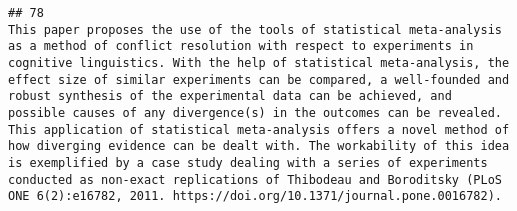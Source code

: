 \documentclass[
  english,
  man]{apa6}
\begin{document}
\begin{verbatim}
## 78                                                                                                                                                                                                                                                                                                                                                                                                                                                                                                                                                                                                                                                                                                                                                                                                                                                                                                                                                                                                                                                                                                                                                                                                                                                                                                                                                                                                                                                                                                                                                                                                                                                                                                                                                                                                                                                                                  This paper proposes the use of the tools of statistical meta-analysis as a method of conflict resolution with respect to experiments in cognitive linguistics. With the help of statistical meta-analysis, the effect size of similar experiments can be compared, a well-founded and robust synthesis of the experimental data can be achieved, and possible causes of any divergence(s) in the outcomes can be revealed. This application of statistical meta-analysis offers a novel method of how diverging evidence can be dealt with. The workability of this idea is exemplified by a case study dealing with a series of experiments conducted as non-exact replications of Thibodeau and Boroditsky (PLoS ONE 6(2):e16782, 2011. https://doi.org/10.1371/journal.pone.0016782).

\end{verbatim}
\end{document}
